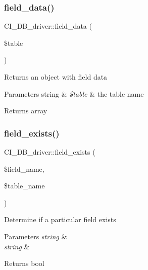 \subsubsection{\texorpdfstring{field\+\_\+data()}{field\_data()}}
{\footnotesize\ttfamily C\+I\+\_\+\+D\+B\+\_\+driver\+::field\+\_\+data (\begin{DoxyParamCaption}\item[{}]{\$table }\end{DoxyParamCaption})}

Returns an object with field data


\begin{DoxyParams}[1]{Parameters}
string & {\em \$table} & the table name \\
\hline
\end{DoxyParams}
\begin{DoxyReturn}{Returns}
array 
\end{DoxyReturn}
\mbox{\label{class_c_i___d_b__driver_ab5860c350fadfc004f1a44e232d5899d}} 
\subsubsection{\texorpdfstring{field\+\_\+exists()}{field\_exists()}}
{\footnotesize\ttfamily C\+I\+\_\+\+D\+B\+\_\+driver\+::field\+\_\+exists (\begin{DoxyParamCaption}\item[{}]{\$field\+\_\+name,  }\item[{}]{\$table\+\_\+name }\end{DoxyParamCaption})}

Determine if a particular field exists


\begin{DoxyParams}{Parameters}
{\em string} & \\
\hline
{\em string} & \\
\hline
\end{DoxyParams}
\begin{DoxyReturn}{Returns}
bool 
\end{DoxyReturn}
\mbox{\label{class_c_i___d_b__driver_aa04f555c219b29ce8519eeb0e4e8446c}} 
